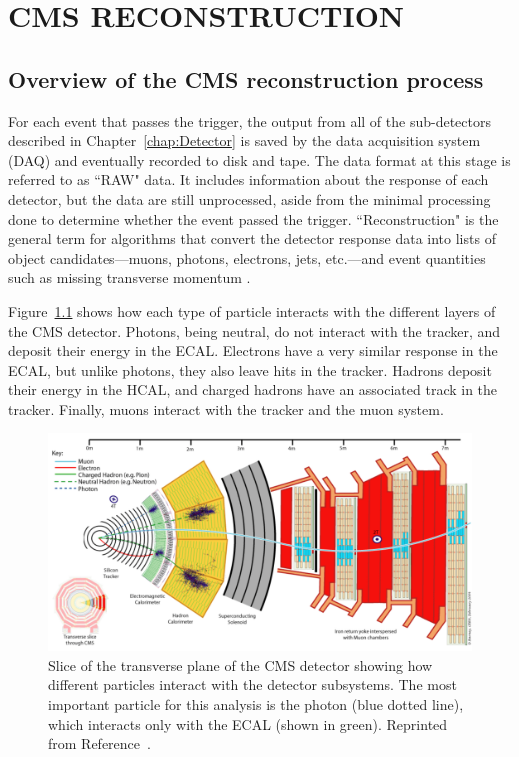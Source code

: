 \chapter{CMS RECONSTRUCTION}
\label{sec:EventReconstruction}

\section{Overview of the CMS reconstruction process}
\label{sec:recoOverview}

For each event that passes the trigger, the output from all of the sub-detectors described in Chapter~\ref{chap:Detector} is saved by the data acquisition system (DAQ) and eventually recorded to disk and tape. The data format at this stage is referred to as ``RAW" data. It includes information about the response of each detector, but the data are still unprocessed, aside from the minimal processing done to determine whether the event passed the trigger. ``Reconstruction" is the general term for algorithms that convert the detector response data into lists of object candidates---muons, photons, electrons, jets, etc.---and event quantities such as missing transverse momentum \ptmiss. 

Figure~\ref{fig:cmsSlice} shows how each type of particle interacts with the different layers of the CMS detector. Photons, being neutral, do not interact with the tracker, and deposit their energy in the ECAL. Electrons have a very similar response in the ECAL, but unlike photons, they also leave hits in the tracker. Hadrons deposit their energy in the HCAL, and charged hadrons have an associated track in the tracker. Finally, muons interact with the tracker and the muon system. 

 \begin{figure}[h!]
	\centering
	\includegraphics[width=\linewidth]{Figures/EventReconstruction/cms_slice.pdf}
       \caption{Slice of the transverse plane of the CMS detector showing how different particles interact with the detector subsystems. The most important particle for this analysis is the photon (blue dotted line), which interacts only with the ECAL (shown in green).
       Reprinted from Reference~\cite{CDS}.}
       \label{fig:cmsSlice}
\end{figure}

